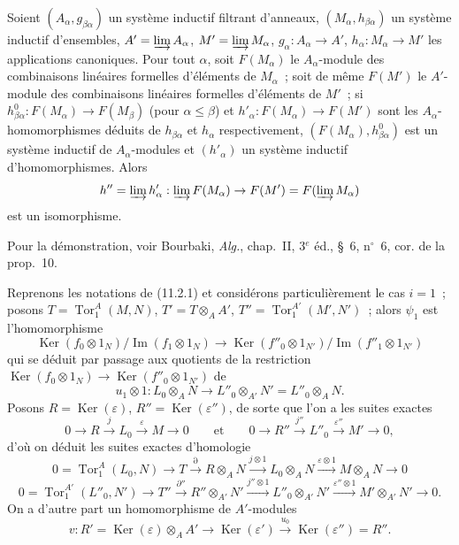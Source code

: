 
\begin{lemma}[11.2.2.2]
\label{IV.11.2.2.2-fr}
Soient $(A_\alpha,g_{\beta\alpha})$ un système inductif filtrant d'anneaux,
$(M_\alpha,h_{\beta\alpha})$ un système inductif d'ensembles,
$A'=\varinjlim A_\alpha$, $M'=\varinjlim M_\alpha$,
$g_\alpha:A_\alpha\to A'$, $h_\alpha:M_\alpha\to M'$ les applications
canoniques. Pour tout $\alpha$, soit $F(M_\alpha)$ le $A_\alpha$-module des
combinaisons linéaires formelles d'éléments de $M_\alpha$~; soit de même
$F(M')$ le $A'$-module des combinaisons linéaires formelles d'éléments de
$M'$~; si $h^0_{\beta\alpha}:F(M_\alpha)\to F(M_\beta)$ (pour
$\alpha\leq\beta$) et $h'_\alpha:F(M_\alpha)\to F(M')$ sont les
$A_\alpha$-homomorphismes déduits de $h_{\beta\alpha}$ et $h_\alpha$
respectivement, $(F(M_\alpha),h^0_{\beta\alpha})$ est un système inductif
de $A_\alpha$-modules et $(h'_\alpha)$ un système inductif
d'homomorphismes. Alors
\[
h''=\varinjlim h'_\alpha:\varinjlim F(M_\alpha)\to
F(M')=F(\varinjlim M_\alpha)
\]
est un isomorphisme.
\end{lemma}

Pour la démonstration, voir Bourbaki, \emph{Alg.}, chap.~II, 3$^e$ éd.,
\S~6, n$^\circ$~6, cor. de la prop.~10.

\begin{env}[11.2.3]
\label{IV.11.2.3-fr}
Reprenons les notations de (11.2.1) et considérons particulièrement le cas
$i=1$~; posons $T=\operatorname{Tor}_1^A(M,N)$, $T'=T\otimes_AA'$,
$T''=\operatorname{Tor}_1^{A'}(M',N')$~; alors $\psi_1$ est
l'homomorphisme
\[
\operatorname{Ker}(f_0\otimes1_N)/\operatorname{Im}(f_1\otimes1_N)
\to
\operatorname{Ker}(f''_0\otimes1_{N'})/
\operatorname{Im}(f''_1\otimes1_{N'})
\]
qui se déduit par passage aux quotients de la restriction
$\operatorname{Ker}(f_0\otimes1_N)\to
\operatorname{Ker}(f''_0\otimes1_{N'})$ de
\[
u_1\otimes1:L_0\otimes_AN\to L''_0\otimes_{A'}N'=L''_0\otimes_AN.
\]
Posons $R=\operatorname{Ker}(\varepsilon)$,
$R''=\operatorname{Ker}(\varepsilon'')$, de sorte que l'on a les suites
exactes
\[
0\to R\xrightarrow{j}L_0\xrightarrow{\varepsilon}M\to0
\qquad\text{et}\qquad
0\to R''\xrightarrow{j''}L''_0\xrightarrow{\varepsilon''}M'\to0,
\]
d'où on déduit les suites exactes d'homologie
\begin{equation}
0=\operatorname{Tor}_1^A(L_0,N)\to T\xrightarrow{\partial}R\otimes_AN
\xrightarrow{j\otimes1}L_0\otimes_AN\xrightarrow{\varepsilon\otimes1}
M\otimes_AN\to0
\label{IV.11.2.3.1-fr}
\tag{11.2.3.1}
\end{equation}
\begin{equation}
0=\operatorname{Tor}_1^{A'}(L''_0,N')\to T''\xrightarrow{\partial''}
R''\otimes_{A'}N'\xrightarrow{j''\otimes1}L''_0\otimes_{A'}N'
\xrightarrow{\varepsilon''\otimes1}M'\otimes_{A'}N'\to0.
\label{IV.11.2.3.2-fr}
\tag{11.2.3.2}
\end{equation}
On a d'autre part un homomorphisme de $A'$-modules
\[
v:R'=\operatorname{Ker}(\varepsilon)\otimes_AA'
\to\operatorname{Ker}(\varepsilon')\xrightarrow{u_0}
\operatorname{Ker}(\varepsilon'')=R''.
\]
\end{env}

